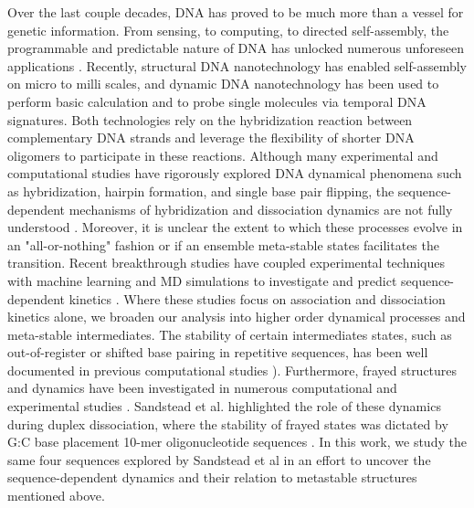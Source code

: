 \documentclass[journal=jpcbfk,manuscript=article]{achemso}
\begin{document}
Over the last couple decades, DNA has proved to be much more than a vessel for genetic information. From sensing, to computing, to directed self-assembly, the programmable and predictable nature of DNA has unlocked numerous unforeseen applications \citep{Seeman2017DNANanotechnology, Adleman1994MolecularProblems.pdf, Rothemund2006FoldingPatterns, Gu2010ALine}. Recently, structural DNA nanotechnology has enabled self-assembly on micro to milli scales, and dynamic DNA nanotechnology has been used to perform basic calculation and to probe single molecules via temporal DNA signatures\citep{MhatreV.HoJi-AnnLee2012NIHAccess, Bui2018, Shah2019}. Both technologies rely on the hybridization reaction between complementary DNA strands and leverage the flexibility of shorter DNA oligomers to participate in these reactions. Although many experimental and computational studies have rigorously explored DNA dynamical phenomena such as hybridization, hairpin formation, and single base pair flipping, the sequence-dependent mechanisms of hybridization and dissociation dynamics are not fully understood \citep{Yin2011KineticsHybridization, Xiao2019, Hinckley2014Coarse-grainedEffects, Sanstead2016, Porschke1971CooperativeTransition, Porschke1973ThermodynamicsPairs, Chen2007InfluenceHybridization, Craig1971ElaxationOligon}. Moreover, it is unclear the extent to which these processes evolve in an "all-or-nothing" fashion or if an ensemble meta-stable states facilitates the transition. Recent breakthrough studies have coupled experimental techniques with machine learning and MD simulations to investigate and predict sequence-dependent kinetics \citep{Schickinger2018TetheredHelices, Zhang2018PredictingSequence}. Where these studies focus on association and dissociation kinetics alone, we broaden our analysis into higher order dynamical processes and meta-stable intermediates. The stability of certain intermediates states, such as out-of-register or shifted base pairing in repetitive sequences, has been well documented in previous computational studies \citep{Phys2014, Xiao2019, Maciejczyk2014DNAModel}). Furthermore, frayed structures and dynamics have been investigated in numerous computational and experimental studies \citep{Zgarbova2014BaseRNA, Nonin1995TerminalFraying, Nikolova2012ProbingSimulations, Andreatta2006UltrafastHelix}. Sandstead et al. highlighted the role of these dynamics during duplex dissociation, where the stability of frayed states was dictated by G:C base placement 10-mer oligonucleotide sequences \citep{Sanstead2016}. In this work, we study the same four sequences explored by Sandstead et al in an effort to uncover the sequence-dependent dynamics and their relation to metastable structures mentioned above.
\end{document}
